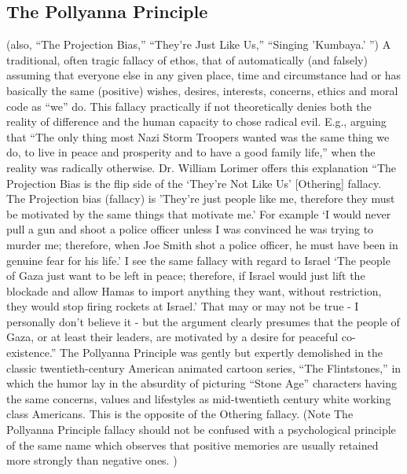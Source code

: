 \documentclass[10pt,a4paper,british]{article}
\begin{document}
\begin{multicols}{2}
	\subsection{The Pollyanna Principle} (also, ``The Projection Bias,''
	``They're Just Like Us,'' ``Singing 'Kumbaya.' '')  A traditional, often
	tragic fallacy of ethos, that of automatically (and falsely) assuming that
	everyone else in any given place, time and circumstance had or has
	basically the same (positive) wishes, desires, interests, concerns, ethics
	and moral code as ``we'' do. This fallacy practically if not theoretically
	denies both the reality of difference and the human capacity to chose
	radical evil.  E.g., arguing that ``The only thing most Nazi Storm Troopers
	wanted was the same thing we do, to live in peace and prosperity and to
	have a good family life,'' when the reality was radically otherwise. Dr.
	William Lorimer offers this explanation ``The Projection Bias is the flip
	side of the `They're Not Like Us' [Othering] fallacy. The Projection bias
	(fallacy) is 'They're just people like me, therefore they must be motivated
	by the same things that motivate me.' For example `I would never pull a gun
	and shoot a police officer unless I was convinced he was trying to murder
	me; therefore, when Joe Smith shot a police officer, he must have been in
	genuine fear for his life.' I see the same fallacy with regard to Israel
	`The people of Gaza just want to be left in peace; therefore, if Israel
	would just lift the blockade and allow Hamas to import anything they want,
	without restriction, they would stop firing rockets at Israel.' That may or
	may not be true {-} I personally don't believe it {-} but the argument
	clearly presumes that the people of Gaza, or at least their leaders, are
	motivated by a desire for peaceful co{-}existence.'' The Pollyanna
	Principle was gently but expertly demolished in the classic
	twentieth{-}century American animated cartoon series, ``The Flintstones,''
	in which the humor lay in the absurdity of picturing ``Stone Age''
	characters having the same concerns, values and lifestyles as
	mid{-}twentieth century white working class Americans.  This is the
	opposite of the Othering fallacy. (Note The Pollyanna Principle fallacy
	should not be confused with a psychological principle of the same name
	which observes that positive memories are usually retained more strongly
	than negative ones. )   


\end{multicols}
\end{document}
